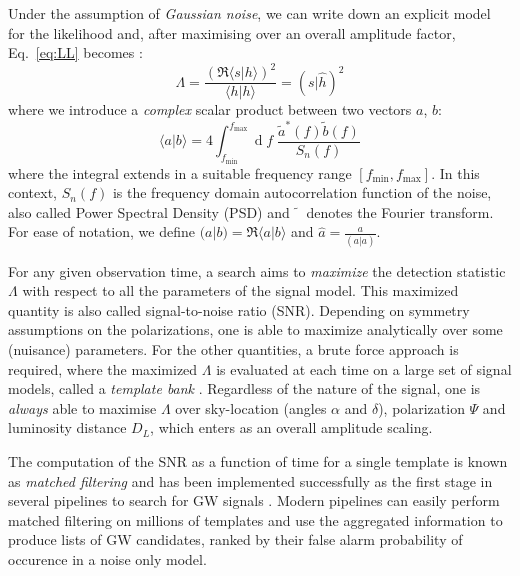 \documentclass[twocolumn,showpacs,preprintnumbers,nofootinbib,prd,
superscriptaddress,10pt]{revtex4-2}
\renewcommand{\d}[1]{\ensuremath{\operatorname{d}\!{#1}}}
\newcommand{\scalar}[2]{\langle #1|#2 \rangle}
\newcommand{\rescalar}[2]{( #1 |#2 )}
\begin{document}
Under the assumption of {\it Gaussian noise}, we can write down an explicit model for the likelihood and, after maximising over an overall amplitude factor, Eq.~\eqref{eq:LL} becomes \cite{Creighton_book, Maggiore:2007ulw, Harry:2016ijz}:
\begin{equation}\label{eq:LL_gauss}
	\Lambda = \frac{\left(\Re\scalar{s}{h}\right)^2}{\scalar{h}{h}} = \rescalar{s}{\hat{h}}^2
\end{equation}
where we introduce a {\it complex} scalar product between two vectors $a$, $b$:
\begin{equation} \label{eq:scalar_product}
	\scalar{a}{b} = 4 \int_{f_\text{min}}^{f_\text{max}} \!\!\!\! \d{f} \; \frac{\tilde{a}^*(f) \tilde{b}(f)}{S_n(f)}
\end{equation}
where the integral extends in a suitable frequency range $[f_\text{min}, f_\text{max}]$.
In this context, $S_n(f)$ is the frequency domain autocorrelation function of the noise, also called Power Spectral Density (PSD) and $\tilde{\phantom{a}}$ denotes the Fourier transform.
For ease of notation, we define ${\rescalar{a}{b} = \Re\scalar{a}{b}}$ and ${\hat{a} = \frac{a}{\rescalar{a}{a}}}$.

For any given observation time, a search aims to {\it maximize} the detection statistic $\Lambda$ with respect to all the parameters of the signal model. This maximized quantity is also called signal-to-noise ratio (SNR).
Depending on symmetry assumptions on the polarizations, one is able to maximize analytically over some (nuisance) parameters.
For the other quantities, a brute force approach is required, where the maximized $\Lambda$ is evaluated at each time on a large set of signal models, called a {\it template bank} \cite{PhysRevD.77.104017, Mukherjee:2018yra}.
Regardless of the nature of the signal, one is {\it always} able to maximise $\Lambda$ over sky-location (angles $\alpha$ and $\delta$), polarization $\Psi$ and luminosity distance $D_L$, which enters as an overall amplitude scaling.

The computation of the SNR as a function of time for a single template is known as {\it matched filtering} and has been implemented successfully as the first stage in several pipelines to search for GW signals \cite{Privitera:2013xza, Usman:2015kfa, Capano:2016dsf, PhysRevD.95.042001, Nitz:2017svb, gstlal_paper2, Aubin:2020goo, Chu:2020pjv}. Modern pipelines can easily perform matched filtering on millions of templates and use the aggregated information to produce lists of GW candidates, ranked by their false alarm probability of occurence in a noise only model.
\end{document}
